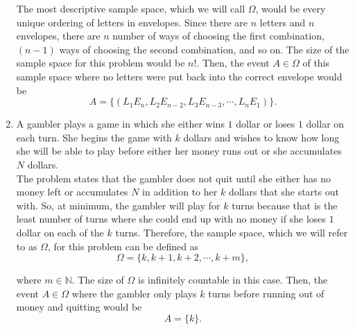 \documentclass[12pt]{article}
\newcommand{\N}{\mathbb{N}}
\begin{document}
\begin{center}
\begin{enumerate}[label=(\alph*)]
The most descriptive sample space, which we will call $\Omega$, would be every unique ordering of letters in envelopes. Since there are $n$ letters and $n$ envelopes, there are $n$ number of ways of choosing the first combination, $(n-1)$ ways of choosing the second combination, and so on. The size of the sample space for this problem would be $n!$. Then, the event $A \in \Omega$ of this sample space where no letters were put back into the correct envelope would be 
\begin{equation*}
A=\big \{ ( L_{1}E_{n}, L_{2}E_{n-2}, L_{3}E_{n-3}, \cdots, L_{n}E_{1} ) \big \}.
\end{equation*}

\item A gambler plays a game in which she either wins $1$ dollar or loses $1$
dollar on each turn. She begins the game with $k$ dollars and wishes to
know how long she will be able to play before either her money runs out
or she accumulates $N$ dollars. \\
\vspace{0.3cm}
The problem states that the gambler does not quit until she either has no money left or accumulates $N$ in addition to her $k$ dollars that she starts out with. So, at minimum, the gambler will play for $k$ turns because that is the least number of turns where she could end up with no money if she loses $1$ dollar on each of the $k$ turns. Therefore, the sample space, which we will refer to as $\Omega$, for this problem can be defined as 
\begin{equation*}
\Omega=\big \{  k, k+1, k+2, \cdots, k+m \big \},
\end{equation*}

\noindent
where $m \in \N$. The size of $\Omega$ is infinitely countable in this case. Then, the event $A \in \Omega$ where the gambler only plays $k$ turns before running out of money and quitting would be
\begin{equation*}
A=\big \{ k \big \}.
\end{equation*}

\end{enumerate}
\end{center}

\end{document}
